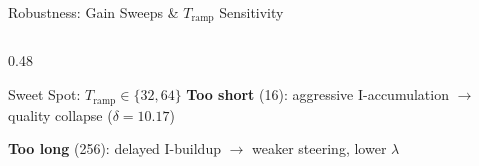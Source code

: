 \documentclass[aspectratio=169, 11pt]{beamer}
\begin{document}
\begin{frame}{Robustness: Gain Sweeps \& $T_\text{ramp}$ Sensitivity}
\begin{columns}[T]
\begin{column}{0.48\textwidth}
\vspace{0.3em}
\begin{block}{Sweet Spot: $T_\text{ramp} \in \{32, 64\}$}
\small
\textbf{Too short} (16): aggressive I-accumulation $\to$ quality collapse ($\delta{=}10.17$)

\textbf{Too long} (256): delayed I-buildup $\to$ weaker steering, lower $\lambda$
\end{block}
\end{column}
\end{columns}

\end{frame}
\end{document}
